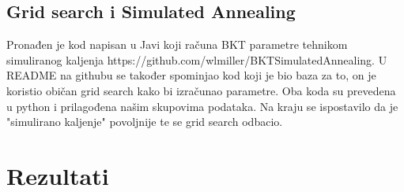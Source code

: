 \documentclass{report}
\begin{document}
	\section{Grid search i Simulated Annealing}
		Pronađen je kod napisan u Javi koji računa BKT parametre tehnikom simuliranog kaljenja https://github.com/wlmiller/BKTSimulatedAnnealing. U README na githubu se također spominjao kod koji je bio baza za to, on je koristio običan grid search kako bi izračunao parametre. Oba koda su prevedena u python i prilagođena našim skupovima podataka. Na kraju se ispostavilo da je "simulirano kaljenje" povoljnije te se grid search odbacio.
	\chapter{Rezultati}
\end{document}

